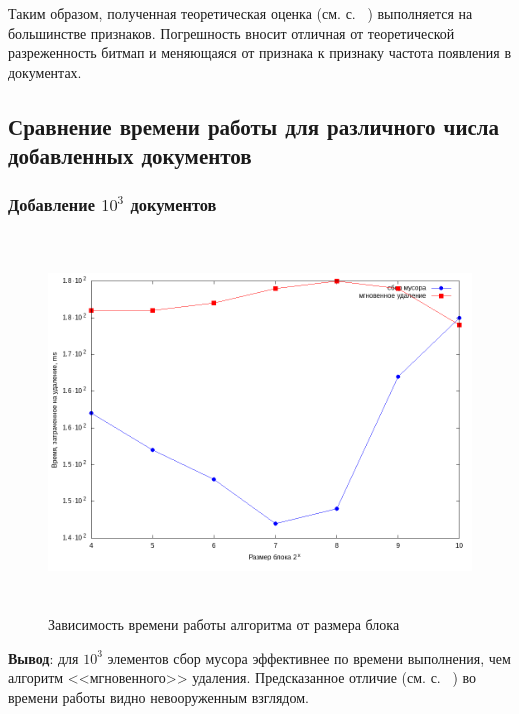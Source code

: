 Таким образом, полученная теоретическая оценка (см. с. ~\pageref{theory})
выполняется на большинстве признаков. Погрешность вносит отличная от теоретической
разреженность битмап и меняющаяся от признака к признаку частота появления в
документах.

\newpage
\subsection{Сравнение времени работы для различного числа добавленных документов}

\subsubsection{Добавление $10^3$ документов}
\begin{figure}[H]
\includegraphics[width=\linewidth, height=10cm]{fig/time_1e3.png}
\caption{Зависимость времени работы алгоритма от размера блока}
\end{figure}

\textbf{Вывод}: для $10^3$ элементов сбор мусора эффективнее по времени
выполнения, чем алгоритм <<мгновенного>> удаления. Предсказанное отличие
(см. с. ~\pageref{theory}) во времени работы видно невооруженным взглядом.

